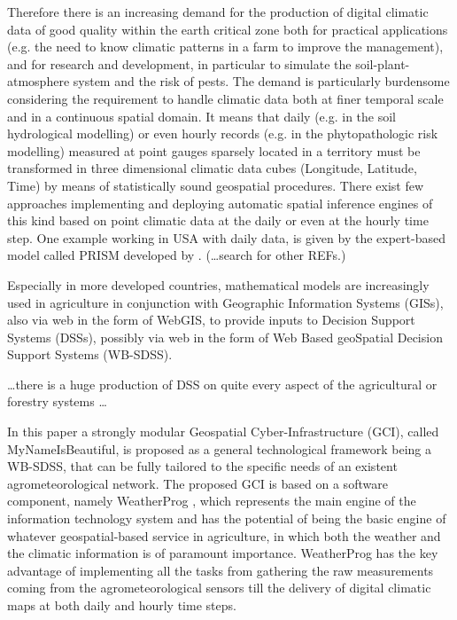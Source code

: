 \documentclass[authoryear,preprint,review,12pt]{elsarticle}
\begin{document}
Therefore there is an increasing demand for the production of digital climatic data of good quality within the earth critical zone both 
    for practical applications (e.g. the need to know climatic patterns in a farm to improve the management),
    and
    for research and development, in particular to simulate the soil-plant-atmosphere system and the risk of pests.
The demand is particularly burdensome considering the requirement to handle climatic data both at finer temporal scale and in a continuous spatial domain.
It means that daily (e.g. in the soil hydrological modelling) or even hourly records (e.g. in the phytopathologic risk modelling) measured at point gauges sparsely located in a territory must be transformed in three dimensional climatic data cubes (Longitude, Latitude, Time) by means of statistically sound geospatial procedures.
There exist few approaches implementing and deploying automatic spatial inference engines of this kind based on point climatic data at the daily or even at the hourly time step.
One example working in USA with daily data, is given by the expert-based model called PRISM developed by  \cite{Daly08_PRISM_USA}. (\ldots search for other REFs.)

Especially in more developed countries, mathematical models are increasingly used in agriculture in conjunction with Geographic Information Systems (GISs), also via web in the form of WebGIS, to provide inputs to Decision Support Systems (DSSs), possibly via web in the form of Web Based geoSpatial Decision Support Systems (WB-SDSS).

\ldots there is a huge production of DSS on quite every aspect of the agricultural or forestry systems \ldots

In this paper a strongly modular Geospatial Cyber-Infrastructure (GCI), called MyNameIsBeautiful, is proposed as a general technological framework being a WB-SDSS, that can be fully tailored to the specific needs of an existent agrometeorological network.
The proposed GCI is based on a software component, namely WeatherProg \citep{langella:weatherprog2014,langella:weatherprog2016}, which represents the main engine of the information technology system and has the potential of being the basic engine of whatever geospatial-based service in agriculture, in which both the weather and the climatic information is of paramount importance.
WeatherProg has the key advantage of implementing all the tasks from gathering the raw measurements coming from the agrometeorological sensors till the delivery of digital climatic maps at both daily and hourly time steps.
\end{document}
